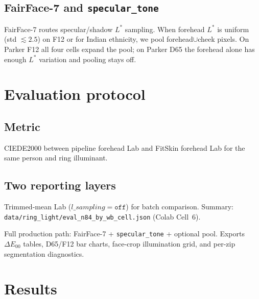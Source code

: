 \documentclass[11pt]{article}
\newcommand{\deee}{\ensuremath{\Delta E_{00}}}
\begin{document}
\subsection{FairFace-7 and \texttt{specular\_tone}}
\label{sec:specular}
FairFace-7 routes specular/shadow $L^*$ sampling.
When forehead $L^*$ is uniform (std $\lesssim 2.5$) on F12 or for Indian
ethnicity, we pool forehead$\cup$cheek pixels.
On Parker F12 all four cells expand the pool; on Parker D65 the forehead alone
has enough $L^*$ variation and pooling stays off.

\FloatBarrier

\section{Evaluation protocol}

\subsection{Metric}
CIEDE2000 between pipeline forehead Lab and FitSkin forehead Lab for the same
person and ring illuminant.

\subsection{Two reporting layers}
\begin{description}[leftmargin=*,style=nextline]
  \item[Cohort tables ($N=84$)]
    Trimmed-mean Lab ($l\_sampling=\texttt{off}$) for batch comparison.
    Summary: \texttt{data/ring\_light/eval\_n84\_by\_wb\_cell.json} (Colab Cell~6).
  \item[Parker WB sweep / Colab Cell~3 ($N=9$)]
    Full production path: FairFace-7 + \texttt{specular\_tone} + optional pool.
    Exports $\deee$ tables, D65/F12 bar charts, face-crop illumination grid, and
    per-zip segmentation diagnostics.
\end{description}

\section{Results}
\end{document}
